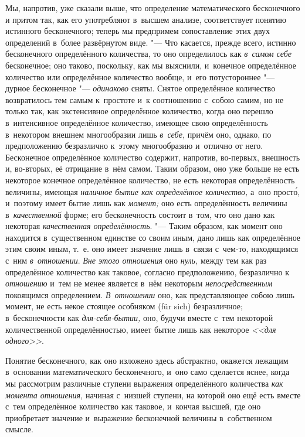 Мы, напротив, уже сказали выше, что определение математического бесконечного и
притом так, как его употребляют в~высшем анализе, соответствует понятию
истинного бесконечного; теперь мы предпримем сопоставление этих двух
определений в~более развёрнутом виде. "--- Что касается, прежде всего, истинно
бесконечного определённого количества, то оно определилось как {\em в~самом
себе} бесконечное; оно таково, поскольку, как мы выяснили, и~конечное
определённое количество или определённое количество вообще, и~его потустороннее
"--- дурное бесконечное "--- {\em одинаково} сняты. Снятое определённое количество
возвратилось тем самым к~простоте и~к соотношению с~собою самим, но не только
так, как экстенсивное определённое количество, когда оно перешло в~интенсивное
определённое количество, имеющее свою определённость в~некотором внешнем
многообразии лишь {\em в~себе,} причём оно, однако, по предположению
безразлично к~этому многообразию и~отлично от него. Бесконечное определённое
количество содержит, напротив, во-первых, внешность и, во-вторых, её отрицание
в~нём самом. Таким образом, оно уже больше не есть некоторое конечное
определённое количество, не есть некоторая определённость величины, имеющая
{\em наличное бытие как определённое количество,} а~оно прост\'{о}, и~поэтому имеет
бытие лишь как {\em момент;} оно есть определённость величины
в~{\em качественной} форме; его бесконечность состоит в~том, что оно дано как
некоторая {\em качественная определённость}. "--- Таким образом, как момент оно
находится в~существенном единстве со своим иным, дано лишь как
определённое этим своим иным, т.~е. оно имеет значение лишь в~связи
с~чем-то, находящимся с~ним {\em в~отношении}. {\em Вне этого отношения} оно
{\em нуль,} между тем как раз определённое количество как таковое, согласно
предположению, безразлично к {\em отношению} и~тем не менее является в~нём
некоторым {\em непосредственным} покоящимся определением. {\em В~отношении}
оно, как представляющее собою лишь момент, не есть некое стоящее особняком
(für sich) безразличное; в~бесконечности как {\em для-себя-бытии,} оно, будучи
вместе с~тем некоторой количественной определённостью, имеет бытие лишь как
некоторое {\em <<для одного>>}.

Понятие бесконечного, как оно изложено здесь абстрактно, окажется лежащим
в~основании математического бесконечного, и~оно само сделается яснее, когда
мы рассмотрим различные ступени выражения определённого количества
{\em как момента отношения,} начиная с~низшей ступени, на которой оно ещё есть
вместе с~тем определённое количество как таковое, и~кончая высшей, где оно
приобретает значение и~выражение бесконечной величины в~собственном смысле.

